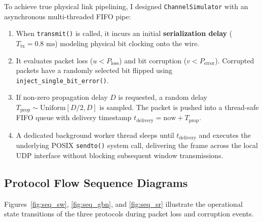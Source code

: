 \documentclass[11pt,a4paper]{article}
\begin{document}
To achieve true physical link pipelining, I designed \texttt{ChannelSimulator} with an asynchronous multi-threaded FIFO pipe:
\begin{enumerate}
    \item When \texttt{transmit()} is called, it incurs an initial \textbf{serialization delay} ($T_{\text{tx}} = 0.8\text{ ms}$) modeling physical bit clocking onto the wire.
    \item It evaluates packet loss ($u < P_{\text{loss}}$) and bit corruption ($v < P_{\text{error}}$). Corrupted packets have a randomly selected bit flipped using \texttt{inject\_single\_bit\_error()}.
    \item If non-zero propagation delay $D$ is requested, a random delay $T_{\text{prop}} \sim \text{Uniform}[D/2, D]$ is sampled. The packet is pushed into a thread-safe FIFO queue with delivery timestamp $t_{\text{delivery}} = \text{now} + T_{\text{prop}}$.
    \item A dedicated background worker thread sleeps until $t_{\text{delivery}}$ and executes the underlying POSIX \texttt{sendto()} system call, delivering the frame across the local UDP interface without blocking subsequent window transmissions.
\end{enumerate}

\subsection{Protocol Flow Sequence Diagrams}
Figures~\ref{fig:seq_sw}, \ref{fig:seq_gbn}, and \ref{fig:seq_sr} illustrate the operational state transitions of the three protocols during packet loss and corruption events.
\end{document}
